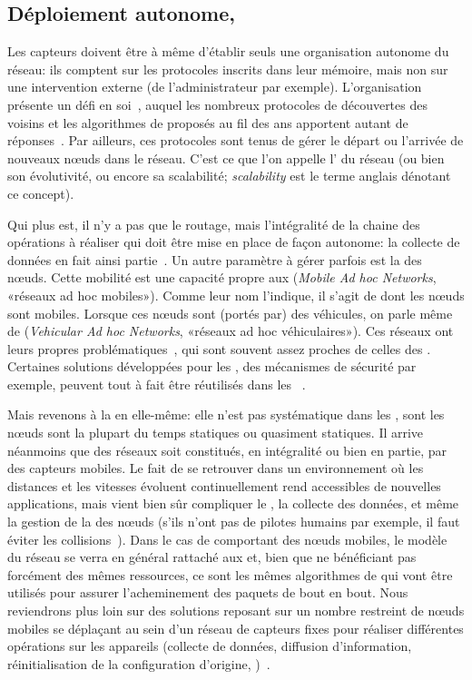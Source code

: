     \subsection{Déploiement autonome, }
Les capteurs doivent être à même d'établir seuls une organisation autonome du réseau: ils comptent sur les protocoles inscrits dans leur mémoire, mais non sur une intervention externe (de l'administrateur par exemple).
L'organisation présente un défi en soi~\cite{TV08}, auquel les nombreux protocoles de découvertes des voisins et les algorithmes de  proposés au fil des ans apportent autant de réponses~\cite{DQWH13}.
Par ailleurs, ces protocoles sont tenus de gérer le départ ou l'arrivée de nouveaux nœuds dans le réseau.
C'est ce que l'on appelle l' du réseau (ou bien son évolutivité, ou encore sa scalabilité; \textit{scalability} est le terme anglais dénotant ce concept).

Qui plus est, il n'y a pas que le routage, mais l'intégralité de la chaine des opérations à réaliser qui doit être mise en place de façon autonome: la collecte de données en fait ainsi partie~\cite{ZWPT10}.
Un autre paramètre à gérer parfois est la  des nœuds.
Cette mobilité est une capacité propre aux \manet (\textit{Mobile Ad hoc Networks}, «réseaux ad hoc mobiles»).
Comme leur nom l'indique, il s'agit de \wanet dont les nœuds sont mobiles.
Lorsque ces nœuds sont (portés par) des véhicules, on parle même de \vanet (\textit{Vehicular Ad hoc Networks}, «réseaux ad hoc véhiculaires»).
Ces réseaux ont leurs propres problématiques~\cite{DYK12}, qui sont souvent assez proches de celles des \rcsfs.
Certaines solutions développées pour les \manet, des mécanismes de sécurité par exemple, peuvent tout à fait être réutilisés dans les \rcs~\cite{BMS13}.

Mais revenons à la  en elle-même: elle n'est pas systématique dans les \rcsfs, sont les nœuds sont la plupart du temps statiques ou quasiment statiques.
Il arrive néanmoins que des réseaux soit constitués, en intégralité ou bien en partie, par des capteurs mobiles.
Le fait de se retrouver dans un environnement où les distances et les vitesses évoluent continuellement rend accessibles de nouvelles applications, mais vient bien sûr compliquer le , la collecte des données, et même la gestion de la  des nœuds (s'ils n'ont pas de pilotes humains par exemple, il faut éviter les collisions~\cite{E-ZCGGK12}).
Dans le cas de \rcs comportant des nœuds mobiles, le modèle du réseau se verra en général rattaché aux \manet et, bien que ne bénéficiant pas forcément des mêmes ressources, ce sont les mêmes algorithmes de  qui vont être utilisés pour assurer l'acheminement des paquets de bout en bout.
Nous reviendrons plus loin sur des solutions reposant sur un nombre restreint de nœuds mobiles se déplaçant au sein d'un réseau de capteurs fixes pour réaliser différentes opérations sur les appareils (collecte de données, diffusion d'information, réinitialisation de la configuration d'origine, \etc)~\cite{HR13}.

